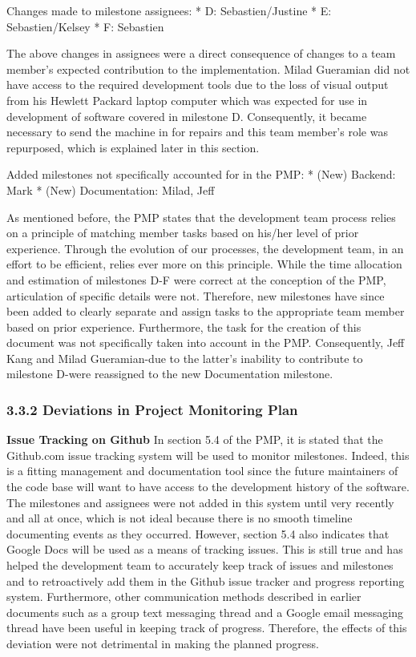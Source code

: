 \documentclass[]{article}
\begin{document}
Changes made to milestone assignees: * D: Sebastien/Justine * E:
Sebastien/Kelsey * F: Sebastien

The above changes in assignees were a direct consequence of changes to a
team member's expected contribution to the implementation. Milad
Gueramian did not have access to the required development tools due to
the loss of visual output from his Hewlett Packard laptop computer which
was expected for use in development of software covered in milestone D.
Consequently, it became necessary to send the machine in for repairs and
this team member's role was repurposed, which is explained later in this
section.

Added milestones not specifically accounted for in the PMP: * (New)
Backend: Mark * (New) Documentation: Milad, Jeff

As mentioned before, the PMP states that the development team process
relies on a principle of matching member tasks based on his/her level of
prior experience. Through the evolution of our processes, the
development team, in an effort to be efficient, relies ever more on this
principle. While the time allocation and estimation of milestones D-F
were correct at the conception of the PMP, articulation of specific
details were not. Therefore, new milestones have since been added to
clearly separate and assign tasks to the appropriate team member based
on prior experience. Furthermore, the task for the creation of this
document was not specifically taken into account in the PMP.
Consequently, Jeff Kang and Milad Gueramian-due to the latter's
inability to contribute to milestone D-were reassigned to the new
Documentation milestone.

\subsubsection{3.3.2 Deviations in Project Monitoring
Plan}\label{deviations-in-project-monitoring-plan}

\textbf{Issue Tracking on Github} In section 5.4 of the PMP, it is
stated that the Github.com issue tracking system will be used to monitor
milestones. Indeed, this is a fitting management and documentation tool
since the future maintainers of the code base will want to have access
to the development history of the software. The milestones and assignees
were not added in this system until very recently and all at once, which
is not ideal because there is no smooth timeline documenting events as
they occurred. However, section 5.4 also indicates that Google Docs will
be used as a means of tracking issues. This is still true and has helped
the development team to accurately keep track of issues and milestones
and to retroactively add them in the Github issue tracker and progress
reporting system. Furthermore, other communication methods described in
earlier documents such as a group text messaging thread and a Google
email messaging thread have been useful in keeping track of progress.
Therefore, the effects of this deviation were not detrimental in making
the planned progress.
\end{document}
